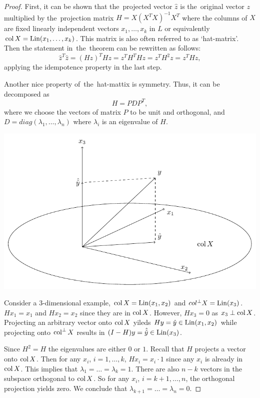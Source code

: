\begin{proof}
First, it can be shown that the~projected vector $\hat z$ is the~original vector $z$
multiplied by the~projection matrix $H = X(X^T X)^{-1}X^T$ where the columns of $X$
are fixed linearly independent vectors $x_1, \ldots, x_k$ in $L$
or equivalently $\operatorname{col} X = \operatorname{Lin}(x_1, \ldots, x_k)$.
This matrix is  also often referred to as `hat-matrix'.
Then the statement in~the~theorem can be rewritten as follows:
\[
\hat z^T \hat z = (Hz)^T Hz = z^T H^T H z = z^T H^2 z = z^T H z,
\]
applying the idempotence property in the last step.

Another nice property of~the~hat-mattix is symmetry.
Thus, it can be decomposed as
\[
H = P D P^T,
\]
where we choose the vectors of matrix $P$ to be unit and orthogonal,
and $D = diag{(\lambda_1, \ldots, \lambda_n)}$ where $\lambda_i$ is an eigenvalue of $H$.

\begin{marginfigure}
  \includegraphics[width=\linewidth]{figures/04_chi_squared_example.pdf}
  \caption{Consider a $3$-dimensional example, $\operatorname{col} X = \operatorname{Lin}(x_1, x_2)$ and $col^{\perp}X = \operatorname{Lin}(x_3)$.
  $H x_1 = x_1$ and $H x_2 = x_2$ since they are in $\operatorname{col} X$. However, $H x_3 = 0$ as $x_3 \perp \operatorname{col} X$.
  Projecting an arbitrary vector onto $\operatorname{col} X$ yileds $Hy = \hat y \in \operatorname{Lin}(x_1, x_2)$
  while projecting onto $\operatorname{col}^{\perp}X$ results in $(I-H)y = \hat{\hat y} \in \operatorname{Lin}(x_3)$.}
\end{marginfigure}

Since $H^2 = H$ the eigenvalues are either $0$ or $1$.
Recall that $H$ projects a vector onto $\operatorname{col} X$.
Then for any $x_i$, $i = 1, \ldots, k$, $H x_i = x_i \cdot 1$ since
any $x_i$ is already in $\operatorname{col} X$. This implies that $\lambda_1 = \ldots = \lambda_k = 1$.
There are also $n-k$ vectors in the subspace orthogonal to $\operatorname{col} X$.
So for any $x_i$, $i= k+1, \ldots, n$, the orthogonal projection yields zero.
We conclude that $\lambda_{k+1} = \ldots = \lambda_n = 0$.


\end{proof}
